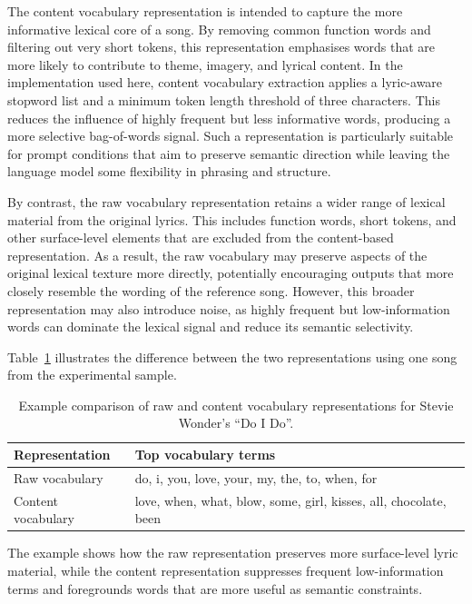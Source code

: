 The content vocabulary representation is intended to capture the more informative lexical core of a song. By removing common function words and filtering out very short tokens, this representation emphasises words that are more likely to contribute to theme, imagery, and lyrical content. In the implementation used here, content vocabulary extraction applies a lyric-aware stopword list and a minimum token length threshold of three characters. This reduces the influence of highly frequent but less informative words, producing a more selective bag-of-words signal. Such a representation is particularly suitable for prompt conditions that aim to preserve semantic direction while leaving the language model some flexibility in phrasing and structure.

By contrast, the raw vocabulary representation retains a wider range of lexical material from the original lyrics. This includes function words, short tokens, and other surface-level elements that are excluded from the content-based representation. As a result, the raw vocabulary may preserve aspects of the original lexical texture more directly, potentially encouraging outputs that more closely resemble the wording of the reference song. However, this broader representation may also introduce noise, as highly frequent but low-information words can dominate the lexical signal and reduce its semantic selectivity.

Table~\ref{tab:raw_content_vocab_example} illustrates the difference between the two representations using one song from the experimental sample.

\begin{table}[ht]
\centering
\caption{Example comparison of raw and content vocabulary representations for Stevie Wonder's ``Do I Do''.}
\label{tab:raw_content_vocab_example}
\begin{tabular}{p{} p{}}
\hline
Representation & Top vocabulary terms \\
\hline
Raw vocabulary & do, i, you, love, your, my, the, to, when, for \\
Content vocabulary & love, when, what, blow, some, girl, kisses, all, chocolate, been \\
\hline
\end{tabular}
\end{table}

The example shows how the raw representation preserves more surface-level lyric material, while the content representation suppresses frequent low-information terms and foregrounds words that are more useful as semantic constraints.

